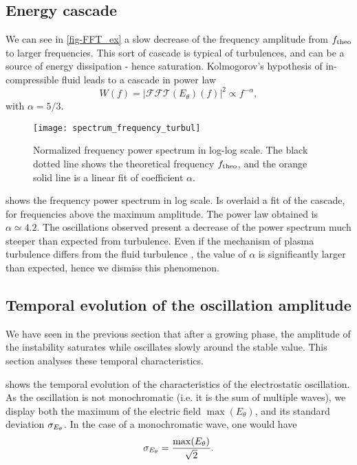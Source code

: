   \subsection{Energy cascade} \label{subsec-turbul}
  
  We can see in \cref{fig-FFT_ex} a slow decrease of the frequency amplitude from $f_{\rm theo}$ to larger frequencies.
  This sort of cascade is typical of turbulences, and can be a source of energy dissipation - hence saturation.
  Kolmogorov's hypothesis of in-compressible fluid leads to a cascade in power law \[ W(f) = | \mathcal{FFT}(E_{\theta})(f) |^2 \propto f ^ {- \alpha}, \]
  with $\alpha = 5/3$.
  
  \begin{figure}[!hbt]
    \centering
    \texttt{[image: spectrum\_frequency\_turbul]}
    \caption{Normalized frequency power spectrum in log-log scale. The black dotted line shows the  theoretical frequency $f_{\rm theo}$, and the orange solid line is a linear fit of coefficient $\alpha$. }
    \label{fig-turbul}
  \end{figure}
  
   shows the frequency power spectrum in log scale.
  Is overlaid a fit of the cascade, for frequencies above the maximum amplitude.
  The power law obtained is $\alpha \simeq 4.2$.
  The oscillations observed present a decrease of the power spectrum much steeper than expected from turbulence.
  Even if the mechanism of plasma turbulence differs from the fluid turbulence \citep{tsytovich1972}, the value of $\alpha$ is significantly larger than expected, hence we dismiss this phenomenon.
  
  \subsection{Temporal evolution of the oscillation amplitude} \label{subsec-temp}
  We have seen in the previous section that after a growing phase, the amplitude of the instability saturates while oscillates slowly around the stable value.
  This section analyses these temporal characteristics.
  
   shows the temporal evolution of the characteristics of the electrostatic oscillation.
  As the oscillation is not monochromatic (i.e. it is the sum of multiple waves), we display both the maximum of the electric field $\max(E_{\theta})$, and its standard deviation $\sigma_{E_{\theta}}$.
  In the case of a monochromatic wave, one would have 
  \[ \sigma_{E_{\theta}} = \frac{\max(E_{\theta})}{\sqrt{2}}.  \]
  
